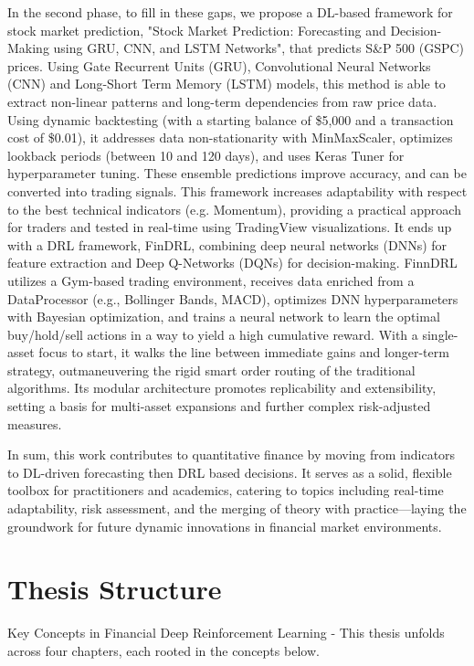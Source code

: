 In the second phase, to fill in these gaps, we propose a DL-based framework for stock market prediction, "Stock Market Prediction: Forecasting and Decision-Making using GRU, CNN, and LSTM Networks", that predicts S\&P 500 (GSPC) prices. Using Gate Recurrent Units (GRU), Convolutional Neural Networks (CNN) and Long-Short Term Memory (LSTM) models, this method is able to extract non-linear patterns and long-term dependencies from raw price data. Using dynamic backtesting (with a starting balance of \$5,000 and a transaction cost of \$0.01), it addresses data non-stationarity with MinMaxScaler, optimizes lookback periods (between 10 and 120 days), and uses Keras Tuner for hyperparameter tuning. These ensemble predictions improve accuracy, and can be converted into trading signals. This framework increases adaptability with respect to the best technical indicators (e.g. Momentum), providing a practical approach for traders and tested in real-time using TradingView visualizations. It ends up with a DRL framework, FinDRL, combining deep neural networks (DNNs) for feature extraction and Deep Q-Networks (DQNs) for decision-making. FinnDRL utilizes a Gym-based trading environment, receives data enriched from a DataProcessor (e.g., Bollinger Bands, MACD), optimizes DNN hyperparameters with Bayesian optimization, and trains a neural network to learn the optimal buy/hold/sell actions in a way to yield a high cumulative reward. With a single-asset focus to start, it walks the line between immediate gains and longer-term strategy, outmaneuvering the rigid smart order routing of the traditional algorithms. Its modular architecture promotes replicability and extensibility, setting a basis for multi-asset expansions and further complex risk-adjusted measures.

In sum, this work contributes to quantitative finance by moving from indicators to DL-driven forecasting then DRL based decisions. It serves as a solid, flexible toolbox for practitioners and academics, catering to topics including real-time adaptability, risk assessment, and the merging of theory with practice—laying the groundwork for future dynamic innovations in financial market environments.

\section{Thesis Structure}
Key Concepts in Financial Deep Reinforcement Learning - This thesis unfolds across four chapters, each rooted in the concepts below.

